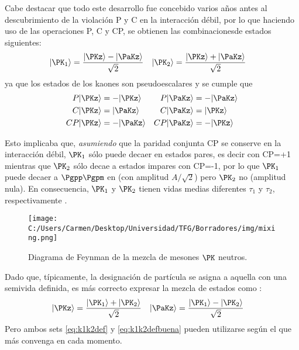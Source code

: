 Cabe destacar que todo este desarrollo fue concebido varios años antes al descubrimiento de la violación P y C en la interacción débil, por lo que haciendo uso de las operaciones P, C y CP, se obtienen las combinaciones\protect\footnotemark de estados siguientes:
\begin{align}
|\PK_{1}\rangle &= \dfrac{|\PKz\rangle - |\PaKz\rangle}{\sqrt{2}} & |\PK_{2}\rangle &= \dfrac{|\PKz\rangle + |\PaKz\rangle}{\sqrt{2}}\label{eq:k1k2def}
\end{align}
ya que los estados de los kaones son pseudoescalares y se cumple que \cite{Griffiths2008}
\begin{align}
P|\PKz\rangle &= -|\PKz\rangle & P|\PaKz\rangle &= -|\PaKz\rangle\\
C|\PKz\rangle &= |\PaKz\rangle & C|\PaKz\rangle &= |\PKz\rangle\\
CP|\PKz\rangle &= -|\PaKz\rangle & CP|\PaKz\rangle &= -|\PKz\rangle
\end{align}


Esto implicaba que, \textit{asumiendo} que la paridad conjunta CP se conserve en la interacción débil, $\PK_{1}$ sólo puede decaer en estados pares, es decir con CP=+1 mientras que $\PK_{2}$ sólo decae a estados impares con CP=-1, por lo que $\PK_{1}$  puede decaer a $\Pgpp \Pgpm$ en (con amplitud $A/ \sqrt{2}$) pero $\PK_{2}$ no (amplitud nula). En consecuencia, $\PK_{1}$ y $\PK_{2}$ tienen vidas medias diferentes $\tau_{1}$ y $\tau_{2}$, respectivamente \cite{Pais} \cite{Perkins}.

\begin{figure}[!ht]
	\centering
	\texttt{[image: C:/Users/Carmen/Desktop/Universidad/TFG/Borradores/img/mixing.png]}
	\caption[Diagrama de Feynmann de la mezcla de mesones $\PK$ neutros]
	{Diagrama de Feynman de la mezcla de mesones $\PK$ neutros. \cite{Thomson}}
	\label{fig:kaonmix}
\end{figure}

Dado que, típicamente, la designación de partícula se asigna a aquella con una semivida definida, es más correcto expresar la mezcla de estados como \cite{Pais}:
\begin{align}
|\PKz\rangle &= \dfrac{|\PK_{1}\rangle + |\PK_{2}\rangle}{\sqrt{2}} & |\PaKz\rangle &= \dfrac{|\PK_{1}\rangle - |\PK_{2}\rangle}{\sqrt{2}}\label{eq:k1k2defbuena}
\end{align}
Pero ambos sets \ref{eq:k1k2def} y \ref{eq:k1k2defbuena} pueden utilizarse según el que más convenga en cada momento.

